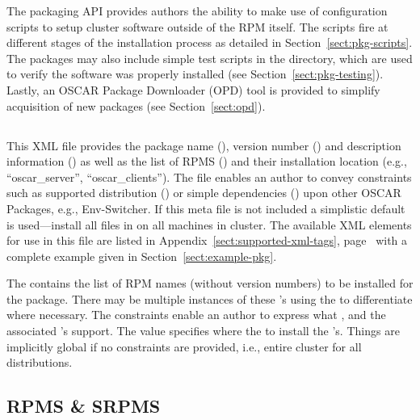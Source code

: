 The packaging API provides authors the ability to make use of configuration
scripts to setup cluster software outside of the RPM itself.  The scripts
fire at different stages of the installation process as detailed in
Section~\ref{sect:pkg-scripts}.  The packages may also include simple test
scripts in the  directory, which are used to verify the
software was properly installed (see Section~\ref{sect:pkg-testing}).
Lastly, an OSCAR Package Downloader (OPD) tool is provided to simplify
acquisition of new packages (see Section~\ref{sect:opd}).




\subsection{}
\label{sect:pkg-config-xml}

This XML file provides the package name (), version number
() and description information () as
well as the list of RPMS () and their installation location
(e.g., ``oscar\_server'', ``oscar\_clients'').   The file enables an author
to convey constraints such as supported distribution () or
simple dependencies () upon other OSCAR Packages, e.g.,
Env-Switcher.  If this meta file is not included a simplistic default is
used---install all files in  on all machines in cluster.
The available XML elements for use in this file are listed in
Appendix~\ref{sect:supported-xml-tags}, page~\pageref{sect:supported-xml-tags}
with a complete example given in Section~\ref{sect:example-pkg}.

The  contains the list of RPM names (without version
numbers) to be installed for the package.  There may be multiple instances
of these 's using the  to differentiate
where necessary.  The  constraints enable an author to
express what ,  and
 the associated 's support.  The 
value specifies where the to install the 's.   Things are
implicitly global if no constraints are provided, i.e., entire cluster for
all distributions.  

%


\subsection{RPMS \& SRPMS}
\label{sect:pkg-rpms-srpms}

